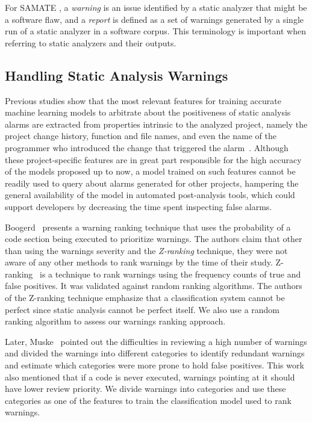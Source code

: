 For SAMATE \cite{black_counting_2011}, a \textit{warning} is an issue identified
by a static analyzer that might be a software flaw, and a \textit{report} is
defined as a set of warnings generated by a single run of a static analyzer in
a software corpus. This terminology is important when referring to static
analyzers and their outputs.

\subsection{Handling Static Analysis Warnings}
\label{sub:related_work}

Previous studies show that the most relevant features for training accurate
machine learning models to arbitrate about the positiveness of static analysis
alarms are extracted from properties intrinsic to the analyzed project,
namely the project change history, function and file names, and even the name
of the programmer who introduced the change that triggered the
alarm~\cite{kremenek2004correlation, heckman2009model, jung2005taming,
ruthruff_predicting_2008, yoon2014reducing}. Although these project-specific
features are in great part responsible for the high accuracy of the models
proposed up to now, a model trained on such features cannot be readily used to
query about alarms generated for other projects, hampering the general
availability of the model in automated post-analysis tools, which could
support developers by decreasing the time spent inspecting false alarms.

Boogerd~\cite{boogerd2006prioritizing} presents a warning ranking technique
that uses the probability of a code section being executed to prioritize
warnings. The authors claim that other than using the warnings severity and the
\textit{Z-ranking} technique, they were not aware of any other methods to rank
warnings by the time of their study. Z-ranking~\cite{kremenek2003z} is a
technique to rank warnings using the frequency counts of true and false
positives. It was validated against random ranking algorithms. The
authors of the Z-ranking technique emphasize that a classification system
cannot be perfect since static analysis cannot be perfect itself.
We also use a random ranking algorithm to assess our warnings ranking approach.

Later, Muske~\cite{muske2013review} pointed out the difficulties in reviewing a high
number of warnings and divided the warnings into different categories to identify
redundant warnings and estimate which categories were more prone to hold false
positives. This work also mentioned that if a code is never executed,
warnings pointing at it should have lower review priority.
We divide warnings into categories and use these categories as one of the features
to train the classification model used to rank warnings.

